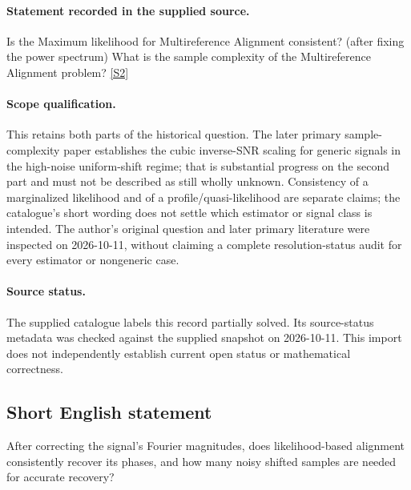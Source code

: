\documentclass[11pt]{article}
\newcommand{\sref}[2]{\hyperlink{source:#1:#2}{[S#2]}}
\begin{document}
\paragraph{Statement recorded in the supplied source.}
Is the Maximum likelihood for Multireference Alignment consistent? (after fixing the power spectrum) What is the sample complexity of the Multireference Alignment problem? \sref{statement}{2}
\paragraph{Scope qualification.}
This retains both parts of the historical question. The later primary sample-complexity paper establishes the cubic inverse-SNR scaling for generic signals in the high-noise uniform-shift regime; that is substantial progress on the second part and must not be described as still wholly unknown. Consistency of a marginalized likelihood and of a profile/quasi-likelihood are separate claims; the catalogue's short wording does not settle which estimator or signal class is intended. The author's original question and later primary literature were inspected on 2026-10-11, without claiming a complete resolution-status audit for every estimator or nongeneric case.
\paragraph{Source status.}
The supplied catalogue labels this record partially solved. Its source-status metadata was checked against the supplied snapshot on 2026-10-11. This import does not independently establish current open status or mathematical correctness.
\subsection{Short English statement}
After correcting the signal's Fourier magnitudes, does likelihood-based alignment consistently recover its phases, and how many noisy shifted samples are needed for accurate recovery?
\end{document}
